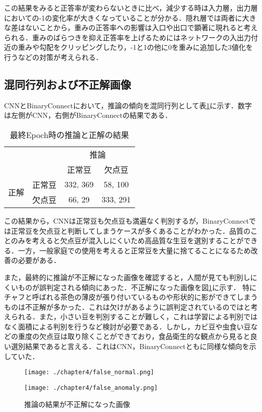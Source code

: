 この結果をみると正答率が変わらないときに比べ，減少する時は入力層，出力層においての-1の変化率が大きくなっていることが分かる．隠れ層では両者に大きな差はないことから，重みの正答率への影響は入口や出口で顕著に現れると考えられる．重みのばらつきを抑え正答率を上げるためにはネットワークの入出力付近の重みや勾配をクリッピングしたり，-1と1の他に0を重みに追加した3値化\cite{li2022ternary}を行うなどの対策が考えられる．

\subsection{混同行列および不正解画像}
CNNとBinaryConnectにおいて，推論の傾向を混同行列として表\ref{table_conf}に示す．数字は左側がCNN，右側がBinaryConnectの結果である．
\begin{table}[htbp]
  \caption{最終Epoch時の推論と正解の結果}
  \label{table_conf}
  \centering
  \begin{tabular}{cc|cc}
    \multicolumn{2}{c|}{} & \multicolumn{2}{c}{推論}\\
    &  & 正常豆& 欠点豆\\
    \hline
    \multirow{2}{*}{正解}& 正常豆& 332, 369& 58, 100\\
    & 欠点豆& 66, 29& 333, 291
  \end{tabular}
\end{table}

この結果から，CNNは正常豆も欠点豆も満遍なく判別するが，BinaryConnectでは正常豆を欠点豆と判断してしまうケースが多くあることがわかった．品質のことのみを考えると欠点豆が混入しにくいため高品質な生豆を選別することができる．一方，一般家庭での使用を考えると正常豆を大量に捨てることになるため改善の必要がある．

また，最終的に推論が不正解になった画像を確認すると，人間が見ても判別しにくいものが誤判定される傾向にあった．不正解になった画像を図\ref{fig_false_image}に示す．
特にチャフと呼ばれる茶色の薄皮が張り付いているものや形状的に影ができてしまうものは不正解が多かった．これは欠けがあるように誤判定されているのではと考えられる．また，小さい豆を判別することが難しく，これは学習による判別ではなく面積による判別を行うなど検討が必要である．しかし，カビ豆や虫食い豆などの重度の欠点豆は取り除くことができており，食品衛生的な観点から見ると良い選別結果であると言える．これはCNN，BinaryConnectともに同様な傾向を示していた．
\begin{figure}[htbp]
  \begin{minipage}[b]{0.5\linewidth}
    \centering
    \texttt{[image: ./chapter4/false\_normal.png]}
  \end{minipage}
  \begin{minipage}[b]{0.5\linewidth}
    \centering
    \texttt{[image: ./chapter4/false\_anomaly.png]}
  \end{minipage}
  \caption{推論の結果が不正解になった画像}
  \label{fig_false_image}
\end{figure}

